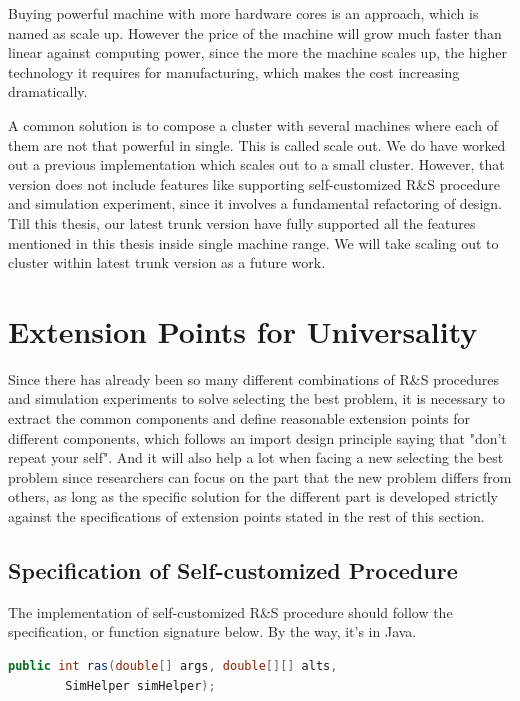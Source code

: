 \documentclass[12pt,a4paper]{report}
\begin{document}
Buying powerful machine with more hardware cores is an approach, which is named as scale up. However the price of the machine will grow much faster than linear against computing power, since the more the machine scales up, the higher technology it requires for manufacturing, which makes the cost increasing dramatically.

A common solution is to compose a cluster with several machines where each of them are not that powerful in single. This is called scale out. We do have worked out a previous implementation which scales out to a small cluster. However, that version does not include features like supporting self-customized R\&S procedure and simulation experiment, since it involves a fundamental refactoring of design. Till this thesis, our latest trunk version have fully supported all the features mentioned in this thesis inside single machine range. We will take scaling out to cluster within latest trunk version as a future work.

\section{Extension Points for Universality}

Since there has already been so many different combinations of R\&S procedures and simulation experiments to solve selecting the best problem, it is necessary to extract the common components and define reasonable extension points for different components, which follows an import design principle saying that "don't repeat your self". And it will also help a lot when facing a new selecting the best problem since researchers can focus on the part that the new problem differs from others, as long as the specific solution for the different part is developed strictly against the specifications of extension points stated in the rest of this section.

\subsection{Specification of Self-customized Procedure}

The implementation of self-customized R\&S procedure should follow the specification, or function signature below. By the way, it's in Java.

\begin{lstlisting}[language=Java]
public int ras(double[] args, double[][] alts,
        SimHelper simHelper);
\end{lstlisting}
\end{document}
